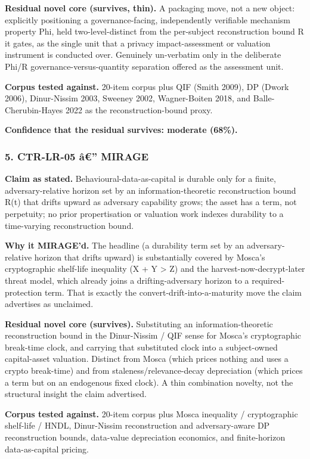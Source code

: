 \documentclass[
  11pt,
]{article}
\begin{document}
\textbf{Residual novel core (survives, thin).} A packaging move, not a
new object: explicitly positioning a governance-facing, independently
verifiable mechanism property Phi, held two-level-distinct from the
per-subject reconstruction bound R it gates, as the single unit that a
privacy impact-assessment or valuation instrument is conducted over.
Genuinely un-verbatim only in the deliberate Phi/R
governance-versus-quantity separation offered as the assessment unit.

\textbf{Corpus tested against.} 20-item corpus plus QIF (Smith 2009), DP
(Dwork 2006), Dinur-Nissim 2003, Sweeney 2002, Wagner-Boiten 2018, and
Balle-Cherubin-Hayes 2022 as the reconstruction-bound proxy.

\textbf{Confidence that the residual survives: moderate (68\%).}

\subsubsection{5. CTR-LR-05 â€'' MIRAGE}\label{ctr-lr-05-uxe2-mirage}

\textbf{Claim as stated.} Behavioural-data-as-capital is durable only
for a finite, adversary-relative horizon set by an information-theoretic
reconstruction bound R(t) that drifts upward as adversary capability
grows; the asset has a term, not perpetuity; no prior propertisation or
valuation work indexes durability to a time-varying reconstruction
bound.

\textbf{Why it MIRAGE'd.} The headline (a durability term set by an
adversary-relative horizon that drifts upward) is substantially covered
by Mosca's cryptographic shelf-life inequality (X + Y \textgreater{} Z)
and the harvest-now-decrypt-later threat model, which already joins a
drifting-adversary horizon to a required-protection term. That is
exactly the convert-drift-into-a-maturity move the claim advertises as
unclaimed.

\textbf{Residual novel core (survives).} Substituting an
information-theoretic reconstruction bound in the Dinur-Nissim / QIF
sense for Mosca's cryptographic break-time clock, and carrying that
substituted clock into a subject-owned capital-asset valuation. Distinct
from Mosca (which prices nothing and uses a crypto break-time) and from
staleness/relevance-decay depreciation (which prices a term but on an
endogenous fixed clock). A thin combination novelty, not the structural
insight the claim advertised.

\textbf{Corpus tested against.} 20-item corpus plus Mosca inequality /
cryptographic shelf-life / HNDL, Dinur-Nissim reconstruction and
adversary-aware DP reconstruction bounds, data-value depreciation
economics, and finite-horizon data-as-capital pricing.
\end{document}
